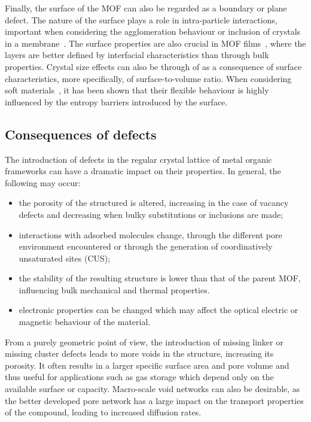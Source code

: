 Finally, the surface of the MOF can also be regarded as a
boundary or plane defect. The nature of the surface plays a role
in intra-particle interactions, important when considering
the agglomeration behaviour or inclusion of crystals in
a membrane~\cite{seminoMicroscopicModelMetal2016}.
The surface properties are also crucial in MOF 
films~\cite{gliemannEpitaxiallyGrownMetalorganic2012, %
	stassenUpdatedRoadmapIntegration2017}, where the layers
are better defined by interfacial characteristics
than through bulk properties.
Crystal size effects can also be through of as a consequence
of surface characteristics, more specifically, of surface-to-volume
ratio. When considering soft 
materials~\cite{krauseEffectCrystalliteSize2018, %
	vanduyfhuysThermodynamicInsightStimuliresponsive2018}, it has
been shown that their flexible behaviour is highly influenced
by the entropy barriers introduced by the surface.

\subsection{Consequences of defects}

The introduction of defects in the regular crystal lattice of metal
organic frameworks can have a dramatic impact on their properties.
In general, the following may occur:

\begin{itemize}
	\item the porosity of the structured is altered, increasing
	      in the case of vacancy defects and decreasing when bulky
	      substitutions or inclusions are made;
	\item interactions with adsorbed molecules change,
	      through the different pore environment encountered or
	      through the generation of coordinatively unsaturated
	      sites (CUS);
	\item the stability of the resulting structure is lower
	      than that of the parent MOF, influencing bulk mechanical
	      and thermal properties.
	\item electronic properties can be changed which may
	      affect the optical electric or magnetic behaviour of the
	      material.
\end{itemize}

From a purely geometric point of view, the introduction of missing
linker or missing cluster defects leads to more voids in the structure,
increasing its porosity. It often results in a larger
specific surface area and pore volume and thus useful for applications
such as gas storage which depend only on the available surface or
capacity. Macro-scale void networks can also be desirable, as the 
better developed pore network has a large impact on the transport
properties of the compound, leading to increased diffusion rates. 

